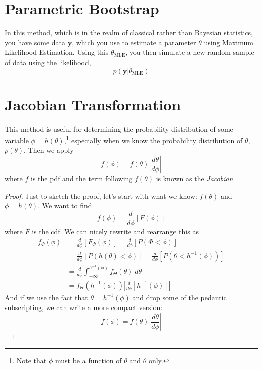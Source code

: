 \documentclass[12pt]{article}
\begin{document}
\newpage
\section{Parametric Bootstrap}

In this method, which is in the realm of classical rather than Bayesian
statistics, you have some data $\mathbf{y}$, which you use to estimate
a parameter $\theta$ using Maximum Likelihood Estimation. Using
this $\theta_{\text{MLE}}$, you then simulate a new random sample of 
data using the likelihood,
\[ p(\mathbf{y} | \theta_{\text{MLE}}) \]

\section{Jacobian Transformation}

This method is useful for determining the probability distribution
of some variable $\phi = h(\theta)$,\footnote{Note that $\phi$ must be a 
function of $\theta$ and $\theta$ only.} especially
when we know the probability distribution 
of $\theta$, $p(\theta)$.  Then we apply
   \[ f(\phi) = f(\theta) \left\lvert 
      \frac{d\theta}{d\phi} \right\rvert \]
where $f$ is the pdf and the term following $f(\theta)$ is known as 
the \emph{Jacobian}.

\begin{proof} 
   Just to sketch the proof, let's start with what we know:
   $f(\theta)$ and $\phi = h(\theta)$. We want to find
      \[ f(\phi) = \frac{d}{d\phi} \left[ F(\phi) \right] \]
   where $F$ is the cdf. We can nicely rewrite and rearrange this as
   \begin{align*}
      f_\Phi(\phi) &= \frac{d}{d\phi} 
      \left[ F_\Phi(\phi) \right] = 
      \frac{d}{d\phi} \left[ P(\Phi < \phi ) \right]
      \\
      &= \frac{d}{d\phi} \left[ P( h(\theta) < \phi ) \right]
	 = \frac{d}{d\phi} \left[ P( \theta < h^{-1}(\phi) )  \right]
      \\ 
      &= \frac{d}{d\phi} \int^{h^{-1}(\phi)}_{-\infty} 
	 f_\Theta(\theta)\; d\theta
      \\
      &= f_\Theta\left( h^{-1}(\phi) \right) \left\lvert 
	 \frac{d}{d\phi} \left[ h^{-1}(\phi) \right] \right\rvert
   \end{align*}
And if we use the fact that $\theta = h^{-1}(\phi)$ and drop some of the
pedantic subscripting, we can write a more compact version:
   \[ f(\phi) = f(\theta) \left\lvert 
      \frac{d\theta}{d\phi} \right\rvert\]

\end{proof}
\end{document}
